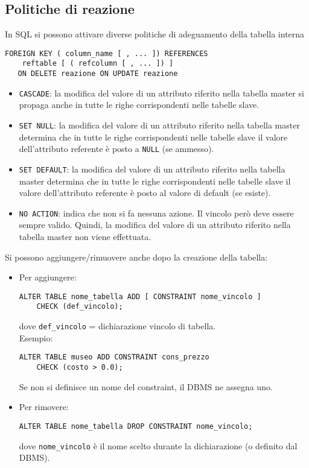 \documentclass[a4paper, 10pt, titlepage]{article}
\begin{document}
	\subsection{Politiche di reazione}
		In SQL si possono attivare diverse politiche di adeguamento della tabella
		interna
		\begin{lstlisting}
FOREIGN KEY ( column_name [ , ... ]) REFERENCES
	reftable [ ( refcolumn [ , ... ]) ]
   ON DELETE reazione ON UPDATE reazione
		\end{lstlisting}
		\begin{itemize}
			\item \lstinline|CASCADE|: la modifica del valore di un attributo riferito nella tabella master
			si propaga anche in tutte le righe corrispondenti nelle tabelle slave.

			\item \lstinline|SET NULL|: la modifica del valore di un attributo riferito nella tabella
			master determina che in tutte le righe corrispondenti nelle tabelle slave
			il valore dell’attributo referente è posto a \lstinline|NULL| (se ammesso).

			\item \lstinline|SET DEFAULT|: la modifica del valore di un attributo riferito nella tabella
			master determina che in tutte le righe corrispondenti nelle tabelle slave
			il valore dell’attributo referente è posto al valore di default (se esiste).

			\item \lstinline|NO ACTION|: indica che non si fa nessuna azione. Il vincolo però deve
			essere sempre valido. Quindi, la modifica del valore di un attributo
			riferito nella tabella master non viene effettuata.
		\end{itemize}
		Si possono aggiungere/rimuovere anche dopo la creazione della tabella:
		\begin{itemize}
\item Per aggiungere:
\begin{lstlisting}
ALTER TABLE nome_tabella ADD [ CONSTRAINT nome_vincolo ]
	CHECK (def_vincolo);
\end{lstlisting}
dove \lstinline|def_vincolo| = dichiarazione vincolo di tabella. \medskip \\
Esempio: 
\begin{lstlisting}
ALTER TABLE museo ADD CONSTRAINT cons_prezzo 
	CHECK (costo > 0.0);
\end{lstlisting}
Se non si definisce un nome del constraint, il DBMS ne assegna uno.
\item Per rimovere:
\begin{lstlisting}
ALTER TABLE nome_tabella DROP CONSTRAINT nome_vincolo;
\end{lstlisting}
dove \lstinline|nome_vincolo| è il nome scelto durante la dichiarazione (o definito dal DBMS).
\end{itemize}
\bigskip
\end{document}
